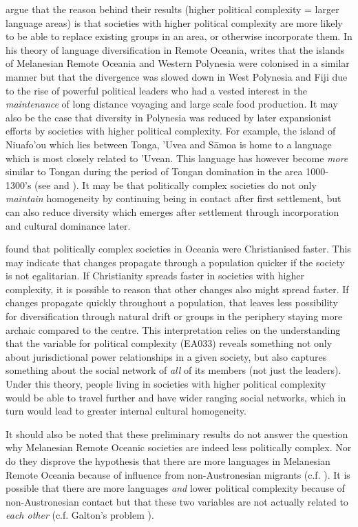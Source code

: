 \documentclass[a4paper,10pt]{article} %
\begin{document}
\citet{curriemace2009} argue that the reason behind their results (higher political complexity = larger language areas) is that societies with higher political complexity are more likely to be able to replace existing groups in an area, or otherwise incorporate them. In his theory of language diversification in Remote Oceania, \citet{pawley2007} writes that the islands of Melanesian Remote Oceania and Western Polynesia were colonised in a similar manner but that the divergence was slowed down in West Polynesia and Fiji due to the rise of powerful political leaders who had a vested interest in the \emph{maintenance} of long distance voyaging and large scale food production. It may also be the case that diversity in Polynesia was reduced by later expansionist efforts by societies with higher political complexity. For example, the island of Niuafo'ou which lies between Tonga, 'Uvea and S\={a}moa is home to a language which is most closely related to 'Uvean. This language has however become \emph{more} similar to Tongan during the period of Tongan domination in the area 1000-1300's (see \citet{aswani1998tongan} and \citep[2-9]{tuskamoto_niuafoou}). It may be that politically complex societies do not only \emph{maintain} homogeneity by continuing being in contact after first settlement, but can also reduce diversity which emerges after settlement through incorporation and cultural dominance later.

\citet{watts_2018} found that politically complex societies in Oceania were Christianised faster. This may indicate that changes propagate through a population quicker if the society is not egalitarian. If Christianity spreads faster in societies with higher complexity, it is possible to reason that other changes also might spread faster. If changes propagate quickly throughout a population, that leaves less possibility for diversification through natural drift or groups in the periphery staying more archaic compared to the centre. This interpretation relies on the understanding that the variable for political complexity (EA033) reveals something not only about jurisdictional power relationships in a given society, but also captures something about the social network of \emph{all} of its members (not just the leaders). Under this theory, people living in societies with higher political complexity would be able to travel further and have wider ranging social networks, which in turn would lead to greater internal cultural homogeneity.

It should also be noted that these preliminary results do not answer the question why Melanesian Remote Oceanic societies are indeed less politically complex. Nor do they disprove the hypothesis that there are more languages in Melanesian Remote Oceania because of influence from non-Austronesian migrants (c.f. \citet{lynch1981melanesian}). It is possible that there are more languages \emph{and} lower political complexity because of non-Austronesian contact but that these two variables are not actually related to \emph{each other} (c.f. Galton's problem \citep{naroll1965galton}). 
\end{document}
